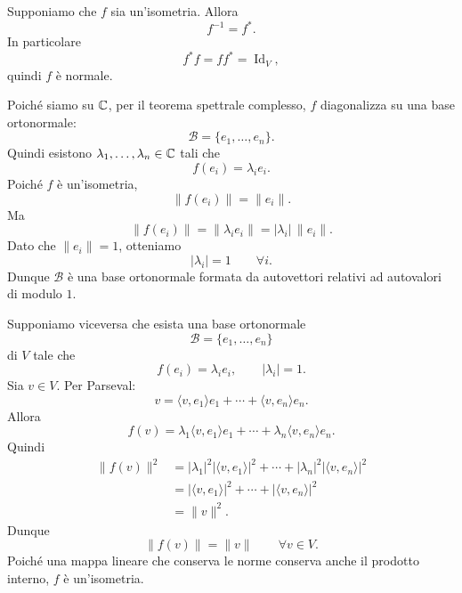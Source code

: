 \documentclass[a4paper]{article}
\begin{document}
\begin{snippetproof}{}
    \begin{iffproof}
    \item Supponiamo che \(f\) sia un'isometria. Allora
        \[
            f^{-1}=f^*.
        \]
        In particolare
        \[
            f^*f=ff^*=\operatorname{Id}_V,
        \]
        quindi \(f\) è normale.

        Poiché siamo su \(\mathbb{C}\), per il teorema spettrale complesso, \(f\) diagonalizza su una base ortonormale:
        \[
            \mathcal{B}=\{e_1,\ldots,e_n\}.
        \]
        Quindi esistono \(\lambda_1,\ldots,\lambda_n\in\mathbb{C}\) tali che
        \[
            f(e_i)=\lambda_i e_i.
        \]
        Poiché \(f\) è un'isometria,
        \[
            \|f(e_i)\|=\|e_i\|.
        \]
        Ma
        \[
            \|f(e_i)\|=\|\lambda_i e_i\|=|\lambda_i|\,\|e_i\|.
        \]
        Dato che \(\|e_i\|=1\), otteniamo
        \[
            |\lambda_i|=1
            \qquad
            \forall i.
        \]
        Dunque \(\mathcal{B}\) è una base ortonormale formata da autovettori relativi ad autovalori di modulo \(1\).

    \item Supponiamo viceversa che esista una base ortonormale
        \[
            \mathcal{B}=\{e_1,\ldots,e_n\}
        \]
        di \(V\) tale che
        \[
            f(e_i)=\lambda_i e_i,
            \qquad
            |\lambda_i|=1.
        \]
        Sia \(v\in V\). Per Parseval:
        \[
            v=
            \langle v,e_1\rangle e_1+\cdots+\langle v,e_n\rangle e_n.
        \]
        Allora
        \[
            f(v)
            =
            \lambda_1\langle v,e_1\rangle e_1
            +\cdots+
            \lambda_n\langle v,e_n\rangle e_n.
        \]
        Quindi
        \begin{align*}
            \|f(v)\|^2
            &=
            |\lambda_1|^2|\langle v,e_1\rangle|^2
            +\cdots+
            |\lambda_n|^2|\langle v,e_n\rangle|^2\\
            &=
            |\langle v,e_1\rangle|^2
            +\cdots+
            |\langle v,e_n\rangle|^2\\
            &=
            \|v\|^2.
        \end{align*}
        Dunque
        \[
            \|f(v)\|=\|v\|
            \qquad
            \forall v\in V.
        \]
        Poiché una mappa lineare che conserva le norme conserva anche il prodotto interno, \(f\) è un'isometria.
    \end{iffproof}
\end{snippetproof}
\end{document}
